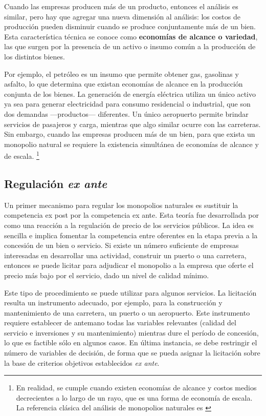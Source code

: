 \documentclass[
  12pt,
  spanish,
]{book}
\begin{document}
Cuando las empresas producen más de un producto, entonces el análisis es
similar, pero hay que agregar una nueva dimensión al análisis: los
costos de producción pueden disminuir cuando se produce conjuntamente
más de un bien. Esta característica técnica se conoce como
\textbf{economías de alcance o variedad}, las que surgen por la
presencia de un activo o insumo común a la producción de los distintos
bienes.

Por ejemplo, el petróleo es un insumo que permite obtener gas, gasolinas
y asfalto, lo que determina que existan economías de alcance en la
producción conjunta de los bienes. La generación de energía eléctrica
utiliza un único activo ya sea para generar electricidad para consumo
residencial o industrial, que son dos demandas ---productos---
diferentes. Un único aeropuerto permite brindar servicios de pasajeros y
carga, mientras que algo similar ocurre con las carreteras. Sin embargo,
cuando las empresas producen más de un bien, para que exista un
monopolio natural se requiere la existencia simultánea de economías de
alcance y de escala. \footnote{En realidad, se cumple cuando existen
  economías de alcance y costos medios decrecientes a lo largo de un
  rayo, que es una forma de economía de escala. La referencia clásica
  del análisis de monopolios naturales es \citet{Panzar1989}}

\hypertarget{regulaciuxf3n-ex-ante}{%
\subsection{\texorpdfstring{Regulación \emph{ex
ante}}{Regulación ex ante}}\label{regulaciuxf3n-ex-ante}}

Un primer mecanismo para regular los monopolios naturales es sustituir
la competencia ex post por la competencia ex ante. Esta teoría fue
desarrollada por \citet{Demsetz1968} como una reacción a la regulación
de precio de los servicios públicos. La idea es sencilla e implica
fomentar la competencia entre oferentes en la etapa previa a la
concesión de un bien o servicio. Si existe un número suficiente de
empresas interesadas en desarrollar una actividad, construir un puerto o
una carretera, entonces se puede licitar para adjudicar el monopolio a
la empresa que oferte el precio más bajo por el servicio, dado un nivel
de calidad mínimo.

Este tipo de procedimiento se puede utilizar para algunos servicios. La
licitación resulta un instrumento adecuado, por ejemplo, para la
construcción y mantenimiento de una carretera, un puerto o un
aeropuerto. Este instrumento requiere establecer de antemano todas las
variables relevantes (calidad del servicio e inversiones y su
mantenimiento) mientras dure el período de concesión, lo que es factible
sólo en algunos casos. En última instancia, se debe restringir el número
de variables de decisión, de forma que se pueda asignar la licitación
sobre la base de criterios objetivos establecidos \emph{ex ante}.
\end{document}

